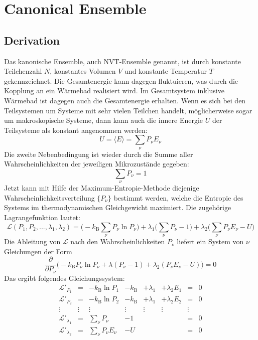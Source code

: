 \documentclass[9pt]{report}
\begin{document}
\section{Canonical Ensemble}

\subsection{Derivation}
Das kanonische Ensemble, auch NVT-Ensemble genannt, ist durch konstante Teilchenzahl $N$, konstantes Volumen $V$ und konstante Temperatur $T$ gekennzeichnet. Die Gesamtenergie kann dagegen fluktuieren, was durch die Kopplung an ein Wärmebad realisiert wird. Im Gesamtsystem inklusive Wärmebad ist dagegen auch die Gesamtenergie erhalten. Wenn es sich bei den Teilsystemen um Systeme mit sehr vielen Teilchen handelt, möglicherweise sogar um makroskopische Systeme, dann kann auch die innere Energie $U$ der Teilsysteme als konstant angenommen werden:
\begin{equation}
U =\langle E\rangle = \sum_{\nu}P_{\nu}E_{\nu}
\end{equation}
Die zweite Nebenbedingung ist wieder durch die Summe aller Wahrscheinlichkeiten der jeweiligen Mikrozustände gegeben:
\begin{equation}
\sum_{\nu}P_{\nu}=1\label{Kanonische Nebenbedingung}
\end{equation}
Jetzt kann mit Hilfe der Maximum-Entropie-Methode diejenige Wahrscheinlichkeitsverteilung $\{P_{\nu}\}$ bestimmt werden, welche die Entropie des Systems im thermodynamischen Gleichgewicht maximiert. Die zugehörige Lagrangefunktion lautet:
\begin{equation}
\mathcal{L}(P_1,P_2,...,\lambda_1,\lambda_2)=\bigg(-k_{\mathrm{B}}\sum_{\nu}P_{\nu}\ln P_{\nu}\bigg)+\lambda_1\bigg(\sum_{\nu}P_{\nu}-1\bigg)+\lambda_2\bigg(\sum_{\nu}P_{\nu}E_{\nu}-U\bigg)
\end{equation}
Die Ableitung von $\mathcal{L}$ nach den Wahrscheinlichkeiten $P_{\nu}$ liefert ein System von $\nu$ Gleichungen der Form
\begin{equation}
\frac{\partial}{\partial P_{\nu}}\bigg(-k_{\mathrm{B}}P_{\nu}\ln P_{\nu}+\lambda(P_{\nu}-1)+\lambda_2(P_{\nu}E_{\nu}-U)\bigg)=0
\end{equation}
Das ergibt folgendes Gleichungssystem:
\begin{equation}
\begin{array}{|cccccccc|}
\mathcal{L}'_{P_1} & = &  -k_{\mathrm{B}}\ln P_1  & -k_{\mathrm{B}} &  +\lambda_1 &  +\lambda_2E_{1} & = & 0\\[3pt]
\mathcal{L}'_{P_2} & = &  -k_{\mathrm{B}}\ln P_2  & -k_{\mathrm{B}} &  +\lambda_1 &  +\lambda_2E_{2} & = & 0\\
\vdots & \vdots & \vdots  &  \vdots  &  \vdots  & \vdots  & \vdots & \\
\mathcal{L}'_{\lambda_1} &  = & \displaystyle\sum_{\nu}P_{\nu} & -1 &  &  & =  & 0\\
\mathcal{L}'_{\lambda_2} &  = & \displaystyle\sum_{\nu}P_{\nu}E_{\nu} & -U &  &  &   =  & 0
\end{array}
\end{equation}
\end{document}
